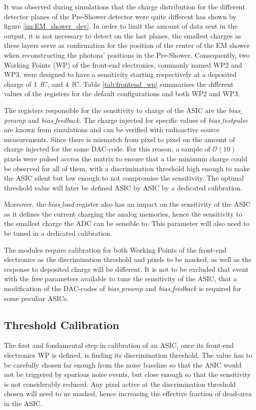 		It was observed during simulations that the charge distribution for the different detector planes of the Pre-Shower detector were quite different has shown by figure \ref{im:EM_shower_dev}. In order to limit the amount of data sent in the output, it is not necessary to detect on the last planes, the smallest charges as these layers serve as confirmation for the position of the center of the EM shower when reconstructing the photons' positions in the Pre-Shower. 
		Consequently, two Working Points (WP) of the front-end electronics, commonly named WP2 and WP3, were designed to have a sensitivity starting respectively at a deposited charge of \SI{1}{\femto\coulomb}, and  \SI{4}{\femto\coulomb}. Table \ref{tab:frontend_wp} summarises the different values of the registers for the default configurations and both WP2 and WP3. 
		
	
		The registers responsible for the sensitivity to charge of the ASIC are the \textit{bias$\_$preamp} and \textit{bias$\_$feedback}. The charge injected for specific values of \textit{bias$\_$testpulse} are known from simulations and can be verified with radioactive source measurements. Since there is mismatch from pixel to pixel on the amount of charge injected for the same DAC-code. For this reason, a sample of $\mathcal{O}(10)$ pixels were pulsed accros the matrix to ensure that a the minimum charge could be observed for all of them, with a discrimination threshold high enough to make the ASIC silent but low enough to not compromise the sensitivity. The optimal threshold value will later be defined ASIC by ASIC by a dedicated calibration.
		
		 Moreover, the \textit{bias$\_$load} register also has an impact on the sensitivity of the ASIC as it defines the current charging the analog memories, hence the sensitivity to the smallest charge the ADC can be sensible to. This parameter will also need to be tuned in a dedicated calibration. 
	
		The modules require calibration for both Working Points of the front-end electronics as the discrimination threshold and pixels to be masked, as well as the response to deposited charge will be different. It is not to be excluded that event with the free parameters available to tune the sensitivity of the ASIC, that a modification of the DAC-codes of \textit{bias$\_$preamp} and \textit{bias$\_$feedback} is required for some peculiar ASICs. 
		
		
		\subsection{Threshold Calibration}
		The first and fondamental step in calibration of an ASIC, once its front-end electronics WP is defined, is finding its discrimination threshold. The value has to be carefully chosen far enough from the noise baseline so that the ASIC would not be triggered by spurious noise events, but close enough so that the sensitivity is not considerably reduced. Any pixel active at the discrimination threshold chosen will need to ne masked, hence increasing the effective fraction of dead-area in the ASIC. 
		
